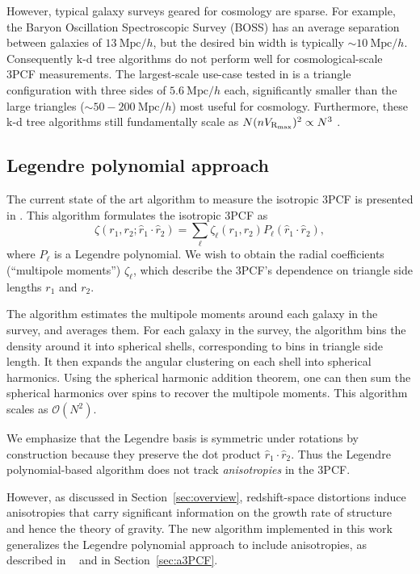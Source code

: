 However, typical galaxy surveys geared for cosmology are sparse. For example,  the Baryon Oscillation Spectroscopic Survey (BOSS) has an average separation between galaxies of $13~\text{Mpc}/h$, but the desired bin width is typically $\sim\! 10~\text{Mpc}/h$. Consequently k-d tree algorithms do not perform well for cosmological-scale 3PCF measurements. 
The largest-scale use-case tested in \cite{March2013} is a triangle configuration  with three sides of $5.6~\text{Mpc}/h$  each, significantly smaller than the large triangles ($\sim\!50-200~\text{Mpc}/h$) most useful for cosmology. Furthermore, these k-d tree algorithms still fundamentally scale as $N(nV_{\rm R_{\rm max}})^2\propto N^3$ \cite{March2013}. 


\subsection{Legendre polynomial approach}

The current state of the art algorithm to measure the isotropic 3PCF is presented in \cite{SE3ptalg}. This algorithm formulates the isotropic 3PCF as
\begin{equation*}
\zeta(r_1, r_2;\hat{r}_1\cdot\hat{r}_2) = \sum_{\ell}\zeta_{\ell}(r_1,r_2)P_{\ell}(\hat{r}_1\cdot\hat{r}_2),
\end{equation*}
where $P_{\ell}$ is a Legendre polynomial. We wish to obtain the radial coefficients (``multipole moments'') $\zeta_{\ell}$, which describe the 3PCF's dependence on triangle side lengths $r_1$ and $r_2$.

The algorithm estimates the multipole moments around each galaxy in the survey, and averages them. For each galaxy in the survey, the algorithm bins the density around it into spherical shells, corresponding to bins in triangle side length. It then expands the angular clustering on each shell into spherical harmonics. Using the spherical harmonic addition theorem, one can then sum the spherical harmonics  over spins to recover the multipole moments. This algorithm scales as $\mathcal{O}(N^2)$.

We emphasize that the Legendre basis is symmetric under rotations by construction because they preserve the dot product $\hat{r}_1\cdot\hat{r}_2$. Thus the Legendre polynomial-based algorithm does not track {\it anisotropies} in the 3PCF. 

However, as  discussed in Section~\ref{sec:overview}, redshift-space distortions induce anisotropies that carry significant information on the growth rate of structure and hence the theory of gravity. The new algorithm implemented in this work  generalizes the Legendre polynomial approach to include anisotropies, as described in ~\cite{SE3ptAniso} and in Section~\ref{sec:a3PCF}. 


